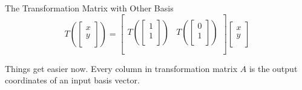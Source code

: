 \documentclass{beamer}
\begin{document}
\begin{frame}{The Transformation Matrix with Other Basis}
\begin{equation*}
    T\left( \left[ \begin{array}{c}
        x\\
        y\\
    \end{array} \right] \right) =\left[ \begin{matrix}
        &		\\
        T\left( \left[ \begin{array}{c}
        1\\
        1\\
    \end{array} \right] \right)&		T\left( \left[ \begin{array}{c}
        0\\
        1\\
    \end{array} \right] \right)\\
        &		\\
    \end{matrix} \right] \left[ \begin{array}{c}
        x\\
        y\\
    \end{array} \right]
\end{equation*}

Things get easier now. Every column in transformation matrix $A$ is the output coordinates of an input basis vector.
\end{frame}
\end{document}

